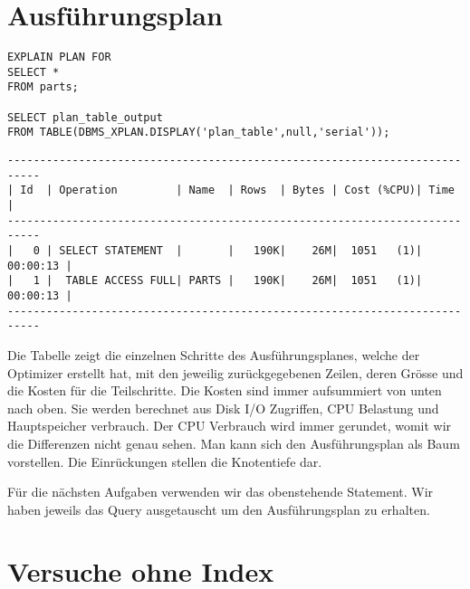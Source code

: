 \documentclass[10pt]{article}
\begin{document}
\section{Ausführungsplan}
\begin{lstlisting}[style=sql]
EXPLAIN PLAN FOR
SELECT *
FROM parts;

SELECT plan_table_output
FROM TABLE(DBMS_XPLAN.DISPLAY('plan_table',null,'serial'));
\end{lstlisting}
\begin{lstlisting}[style=queryexecutionplan]
---------------------------------------------------------------------------
| Id  | Operation         | Name  | Rows  | Bytes | Cost (%CPU)| Time     |
---------------------------------------------------------------------------
|   0 | SELECT STATEMENT  |       |   190K|    26M|  1051   (1)| 00:00:13 |
|   1 |  TABLE ACCESS FULL| PARTS |   190K|    26M|  1051   (1)| 00:00:13 |
---------------------------------------------------------------------------
\end{lstlisting}
Die Tabelle zeigt die einzelnen Schritte des Ausführungsplanes, welche der 
Optimizer erstellt hat, mit den jeweilig zurückgegebenen Zeilen, deren Grösse 
und die Kosten für die Teilschritte. Die Kosten sind immer aufsummiert von 
unten nach oben. Sie werden berechnet aus Disk I/O Zugriffen, CPU Belastung 
und Hauptspeicher verbrauch. Der CPU Verbrauch wird immer gerundet, womit 
wir die Differenzen nicht genau sehen.
Man kann sich den Ausführungsplan als Baum vorstellen. Die Einrückungen 
stellen die Knotentiefe dar.

Für die nächsten Aufgaben verwenden wir das obenstehende Statement. Wir 
haben jeweils das Query ausgetauscht um den Ausführungsplan zu erhalten.

\section{Versuche ohne Index}
\end{document}
